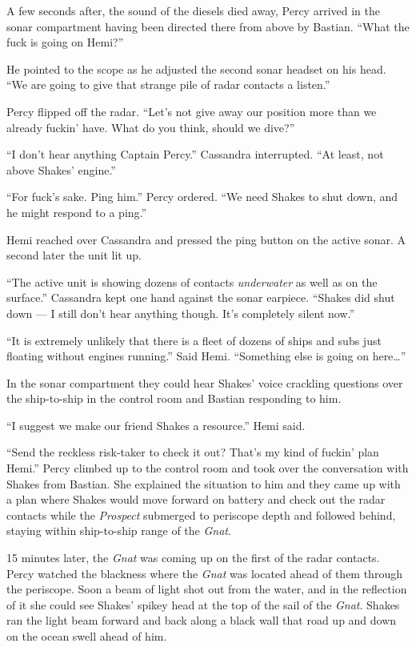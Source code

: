 \documentclass[]{scrbook}
\begin{document}
A few seconds after, the sound of the diesels died away, Percy arrived
in the sonar compartment having been directed there from above by
Bastian. ``What the fuck is going on Hemi?''

He pointed to the scope as he adjusted the second sonar headset on his
head. ``We are going to give that strange pile of radar contacts a
listen.''

Percy flipped off the radar. ``Let's not give away our position more
than we already fuckin' have. What do you think, should we dive?''

``I don't hear anything Captain Percy.'' Cassandra interrupted. ``At
least, not above Shakes' engine.''

``For fuck's sake. Ping him.'' Percy ordered. ``We need Shakes to shut
down, and he might respond to a ping.''

Hemi reached over Cassandra and pressed the ping button on the active
sonar. A second later the unit lit up.

``The active unit is showing dozens of contacts \emph{underwater} as
well as on the surface.'' Cassandra kept one hand against the sonar
earpiece. ``Shakes did shut down --- I still don't hear anything though.
It's completely silent now.''

``It is extremely unlikely that there is a fleet of dozens of ships and
subs just floating without engines running.'' Said Hemi. ``Something
else is going on here\ldots{}''

In the sonar compartment they could hear Shakes' voice crackling
questions over the ship-to-ship in the control room and Bastian
responding to him.

``I suggest we make our friend Shakes a resource.'' Hemi said.

``Send the reckless risk-taker to check it out? That's my kind of
fuckin' plan Hemi.'' Percy climbed up to the control room and took over
the conversation with Shakes from Bastian. She explained the situation
to him and they came up with a plan where Shakes would move forward on
battery and check out the radar contacts while the \emph{Prospect}
submerged to periscope depth and followed behind, staying within
ship-to-ship range of the \emph{Gnat}.

15 minutes later, the \emph{Gnat} was coming up on the first of the
radar contacts. Percy watched the blackness where the \emph{Gnat} was
located ahead of them through the periscope. Soon a beam of light shot
out from the water, and in the reflection of it she could see Shakes'
spikey head at the top of the sail of the \emph{Gnat}. Shakes ran the
light beam forward and back along a black wall that road up and down on
the ocean swell ahead of him.
\end{document}
